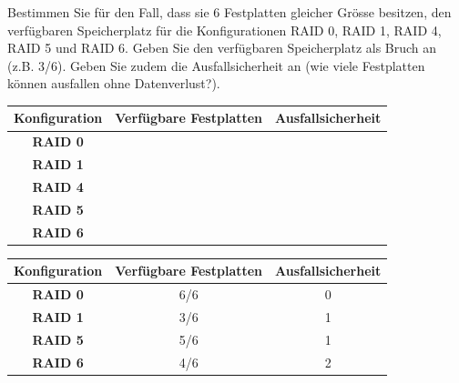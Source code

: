 \begin{myexercise}
    Bestimmen Sie für den Fall, dass sie 6 Festplatten gleicher Grösse besitzen, den verfügbaren Speicherplatz für die Konfigurationen RAID 0, RAID 1, RAID 4, RAID 5 und RAID 6. Geben Sie den verfügbaren Speicherplatz als Bruch an (z.B. 3/6). Geben Sie zudem die Ausfallsicherheit an (wie viele Festplatten können ausfallen ohne Datenverlust?).

    \begin{table}[H]
        \centering
        \begin{tabular}{c||c|c}
            \textbf{Konfiguration} & \textbf{Verfügbare Festplatten} & \textbf{Ausfallsicherheit} \\\midrule\midrule
            \textbf{RAID 0}        &                                 &                            \\[1cm]\midrule
            \textbf{RAID 1}        &                                 &                            \\[1cm]\midrule
            \textbf{RAID 4}        &                                 &                            \\[1cm]\midrule
            \textbf{RAID 5}        &                                 &                            \\[1cm]\midrule
            \textbf{RAID 6}        &                                 &                            \\[1cm]
        \end{tabular}
    \end{table}
    \begin{myanswer}
        \begin{table}[H]
            \centering
            \begin{tabular}{c||c|c}
                \textbf{Konfiguration} & \textbf{Verfügbare Festplatten} & \textbf{Ausfallsicherheit} \\\midrule\midrule
                \textbf{RAID 0}        & 6/6                             & 0                          \\\midrule
                \textbf{RAID 1}        & 3/6                             & 1                          \\\midrule
                \textbf{RAID 5}        & 5/6                             & 1                          \\\midrule
                \textbf{RAID 6}        & 4/6                             & 2                          \\
            \end{tabular}
        \end{table}
    \end{myanswer}
\end{myexercise}


